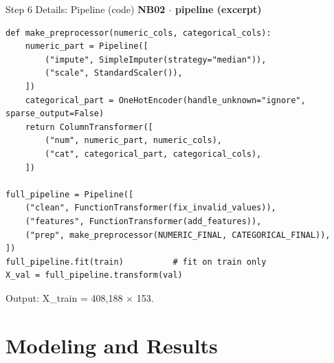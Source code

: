 \documentclass{beamer}
\begin{document}
\begin{frame}[fragile]{Step 6 Details: Pipeline (code)}
  \textbf{\scriptsize NB02 $\cdot$ pipeline (excerpt)}
\begin{lstlisting}
def make_preprocessor(numeric_cols, categorical_cols):
    numeric_part = Pipeline([
        ("impute", SimpleImputer(strategy="median")),
        ("scale", StandardScaler()),
    ])
    categorical_part = OneHotEncoder(handle_unknown="ignore", sparse_output=False)
    return ColumnTransformer([
        ("num", numeric_part, numeric_cols),
        ("cat", categorical_part, categorical_cols),
    ])

full_pipeline = Pipeline([
    ("clean", FunctionTransformer(fix_invalid_values)),
    ("features", FunctionTransformer(add_features)),
    ("prep", make_preprocessor(NUMERIC_FINAL, CATEGORICAL_FINAL)),
])
full_pipeline.fit(train)          # fit on train only
X_val = full_pipeline.transform(val)
\end{lstlisting}
  Output: X\_train = 408,188 $\times$ 153.
\end{frame}

\section{Modeling and Results}
\end{document}
